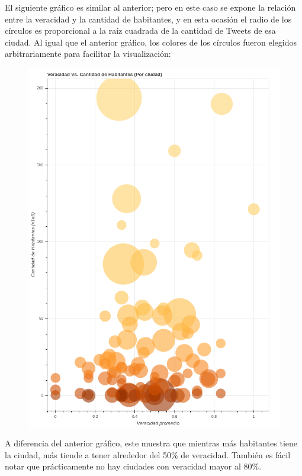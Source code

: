 \documentclass[titlepage,a4paper]{article}
\begin{document}
    El siguiente gráfico es similar al anterior; pero en este caso se expone la relación entre la veracidad y la cantidad de habitantes, y en esta ocasión el radio de los círculos es proporcional a la raíz cuadrada de la cantidad de Tweets de esa ciudad. Al igual que el anterior gráfico, los colores de los círculos fueron elegidos arbitrariamente para facilitar la visualización:
    
    \begin{figure}[H]
    \centering
    \includegraphics[width=1\textwidth]{graficos/Analisis de Locacion/veracidad_vs_cantidad_de_habitantes_por_ciudad.png}
    \caption{}
    \end{figure}
    
    A diferencia del anterior gráfico, este muestra que mientras más habitantes tiene la ciudad, más tiende a tener alrededor del 50\% de veracidad. También es fácil notar que prácticamente no hay ciudades con veracidad mayor al 80\%.
    
\end{document}
